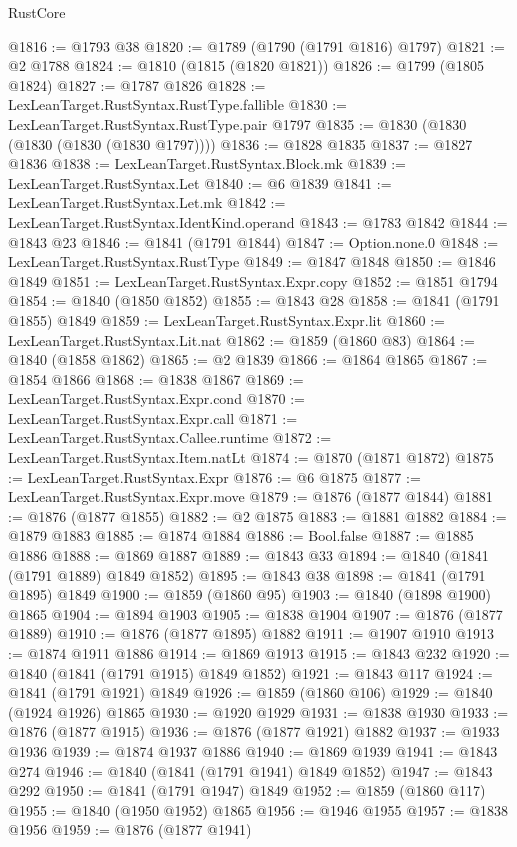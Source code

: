 \begin{lexlean}{RustCore}
\begin{coremodule}
@1816 := @1793 @38
@1820 := @1789 (@1790 (@1791 @1816) @1797)
@1821 := @2 @1788
@1824 := @1810 (@1815 (@1820 @1821))
@1826 := @1799 (@1805 @1824)
@1827 := @1787 @1826
@1828 := LexLeanTarget.RustSyntax.RustType.fallible
@1830 := LexLeanTarget.RustSyntax.RustType.pair @1797
@1835 := @1830 (@1830 (@1830 (@1830 (@1830 @1797))))
@1836 := @1828 @1835
@1837 := @1827 @1836
@1838 := LexLeanTarget.RustSyntax.Block.mk
@1839 := LexLeanTarget.RustSyntax.Let
@1840 := @6 @1839
@1841 := LexLeanTarget.RustSyntax.Let.mk
@1842 := LexLeanTarget.RustSyntax.IdentKind.operand
@1843 := @1783 @1842
@1844 := @1843 @23
@1846 := @1841 (@1791 @1844)
@1847 := Option.none.{0}
@1848 := LexLeanTarget.RustSyntax.RustType
@1849 := @1847 @1848
@1850 := @1846 @1849
@1851 := LexLeanTarget.RustSyntax.Expr.copy
@1852 := @1851 @1794
@1854 := @1840 (@1850 @1852)
@1855 := @1843 @28
@1858 := @1841 (@1791 @1855) @1849
@1859 := LexLeanTarget.RustSyntax.Expr.lit
@1860 := LexLeanTarget.RustSyntax.Lit.nat
@1862 := @1859 (@1860 @83)
@1864 := @1840 (@1858 @1862)
@1865 := @2 @1839
@1866 := @1864 @1865
@1867 := @1854 @1866
@1868 := @1838 @1867
@1869 := LexLeanTarget.RustSyntax.Expr.cond
@1870 := LexLeanTarget.RustSyntax.Expr.call
@1871 := LexLeanTarget.RustSyntax.Callee.runtime
@1872 := LexLeanTarget.RustSyntax.Item.natLt
@1874 := @1870 (@1871 @1872)
@1875 := LexLeanTarget.RustSyntax.Expr
@1876 := @6 @1875
@1877 := LexLeanTarget.RustSyntax.Expr.move
@1879 := @1876 (@1877 @1844)
@1881 := @1876 (@1877 @1855)
@1882 := @2 @1875
@1883 := @1881 @1882
@1884 := @1879 @1883
@1885 := @1874 @1884
@1886 := Bool.false
@1887 := @1885 @1886
@1888 := @1869 @1887
@1889 := @1843 @33
@1894 := @1840 (@1841 (@1791 @1889) @1849 @1852)
@1895 := @1843 @38
@1898 := @1841 (@1791 @1895) @1849
@1900 := @1859 (@1860 @95)
@1903 := @1840 (@1898 @1900) @1865
@1904 := @1894 @1903
@1905 := @1838 @1904
@1907 := @1876 (@1877 @1889)
@1910 := @1876 (@1877 @1895) @1882
@1911 := @1907 @1910
@1913 := @1874 @1911 @1886
@1914 := @1869 @1913
@1915 := @1843 @232
@1920 := @1840 (@1841 (@1791 @1915) @1849 @1852)
@1921 := @1843 @117
@1924 := @1841 (@1791 @1921) @1849
@1926 := @1859 (@1860 @106)
@1929 := @1840 (@1924 @1926) @1865
@1930 := @1920 @1929
@1931 := @1838 @1930
@1933 := @1876 (@1877 @1915)
@1936 := @1876 (@1877 @1921) @1882
@1937 := @1933 @1936
@1939 := @1874 @1937 @1886
@1940 := @1869 @1939
@1941 := @1843 @274
@1946 := @1840 (@1841 (@1791 @1941) @1849 @1852)
@1947 := @1843 @292
@1950 := @1841 (@1791 @1947) @1849
@1952 := @1859 (@1860 @117)
@1955 := @1840 (@1950 @1952) @1865
@1956 := @1946 @1955
@1957 := @1838 @1956
@1959 := @1876 (@1877 @1941)

\end{coremodule}
\end{lexlean}
